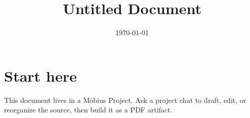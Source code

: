 \documentclass[11pt]{article}
\title{Untitled Document}
\author{}
\date{\today}
\begin{document}
\maketitle

\section{Start here}
This document lives in a Möbius Project. Ask a project chat to draft, edit, or reorganize the source, then build it as a PDF artifact.
\end{document}
